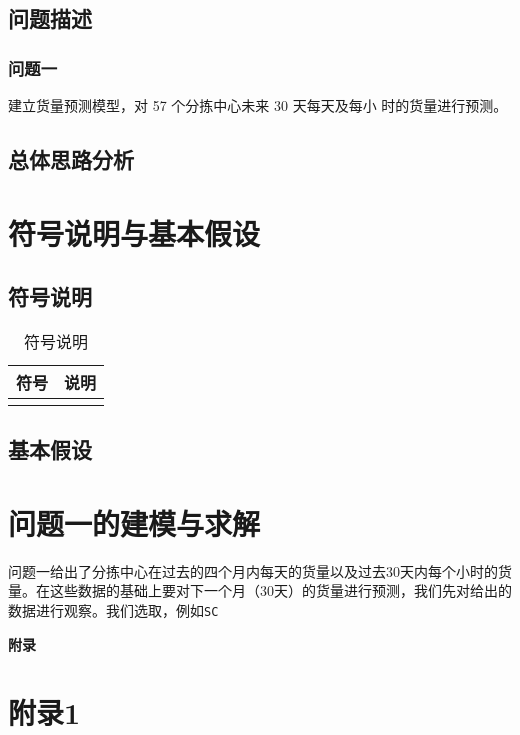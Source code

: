 \documentclass[UTF8,a4paper,10 pt]{article}%
\begin{document}
\subsection{问题描述}
\subsubsection{问题一}
建立货量预测模型，对 57 个分拣中心未来 30 天每天及每小
时的货量进行预测。


\subsection{总体思路分析}



\clearpage
\section{符号说明与基本假设}
\subsection{符号说明}

\begin{table}[!ht]
\caption{符号说明}%
\centering%
\begin{tabular}{p{4cm}<{\centering}p{8cm}<{\centering}}%
\toprule%
符号&说明 \\
\midrule%
&\\
\bottomrule%

\end{tabular}
\end{table}

\subsection{基本假设}

\clearpage
\section{问题一的建模与求解}
问题一给出了分拣中心在过去的四个月内每天的货量以及过去30天内每个小时的货量。在这些数据的基础上要对下一个月（30天）的货量进行预测，我们先对给出的数据进行观察。我们选取，例如{\tt SC}



\clearpage
\begin{center}
    \huge \bf 附录
\end{center}
\appendix
\section{附录1}
\end{document}
